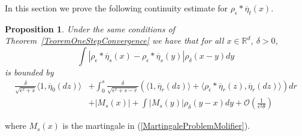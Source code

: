 \documentclass[12pt]{article}
\newtheorem{proposition}[theorem]{Proposition}
\begin{document}
In this section we prove the following continuity estimate for $\rho_\epsilon * \overline{\eta}_t(x)$.
\begin{proposition} \label{ContinuityEstimate}
Under the same conditions of Theorem~\ref{TeoremOneStepConvergence} we have that for all $x \in \mathbb{R}^d$, $\delta>0$,
\[
\int |\rho_\epsilon*\overline{\eta}_s(x) -\rho_\epsilon*\overline{\eta}_s(y)| \rho_\delta(x-y) dy \]
is bounded by
\begin{align*}
\frac{\delta}{\sqrt{\epsilon^2+s}} \langle 1,\overline{\eta}_0(dz) \rangle &+ \int_0^s \frac{\delta}{\sqrt{\epsilon^2+s-r}} (\langle 1, \overline{\eta}_r(dz)\rangle + \langle \rho_\epsilon*\overline{\eta}_r(z), \overline{\eta}_r(dz)\rangle)dr \\ &+ |M_s(x)| + \int |M_s(y)| \rho_\delta(y-x)dy + \mathcal{O}\left( \frac{1}{\epsilon^2 \theta}\right)
\end{align*} 
\end{proposition}
where $M_s(x)$ is the martingale in (\ref{MartingaleProblemMolifier}).
\end{document}
